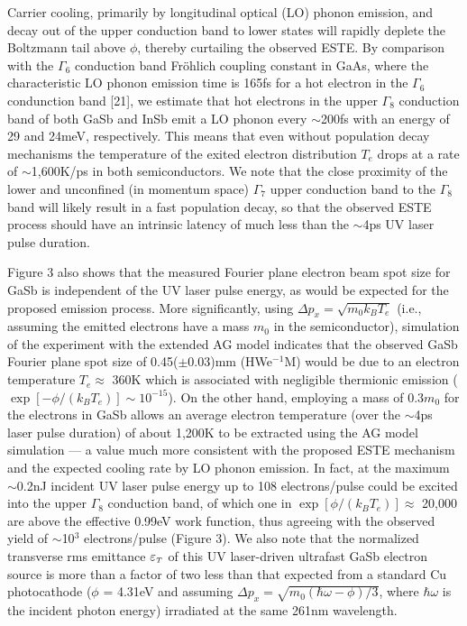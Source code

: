 Carrier cooling, primarily by longitudinal optical (LO) phonon emission, and decay out of the upper conduction band to lower states will rapidly deplete the Boltzmann tail above $\phi$, thereby curtailing the observed ESTE.
By comparison with the $\Gamma_6$ conduction band Fr\"ohlich coupling constant in GaAs, where the characteristic LO phonon emission time is 165fs for a hot electron in the $\Gamma_6$ condunction band [21], we estimate that hot electrons in the upper $\Gamma_8$ conduction band of both GaSb and InSb emit a LO phonon every $\sim$200fs with an energy of 29 and 24meV, respectively.
This means that even without population decay mechanisms the temperature of the exited electron distribution $T_e$ drops at a rate of $\sim$1,600K/ps in both semiconductors.
We note that the close proximity of the lower and unconfined (in momentum space) $\Gamma_7$ upper conduction band to the $\Gamma_8$ band will likely result in a fast population decay, so that the observed ESTE process should have an intrinsic latency of much less than the $\sim$4ps UV laser pulse duration.

Figure 3 also shows that the measured Fourier plane electron beam spot size for GaSb is independent of the UV laser pulse energy, as would be expected for the proposed emission process.
More significantly, using $\Delta p_x = \sqrt{m_0 k_B T_e}$ (i.e., assuming the emitted electrons have a mass $m_0$ in the semiconductor), simulation of the experiment with the extended AG model\cite{berger_semi-analytic_2010} indicates that the observed GaSb Fourier plane spot size of 0.45($\pm$0.03)mm (HWe$^{-1}$M) would be due to an electron temperature $T_e \approx$ 360K which is associated with negligible thermionic emission ($\exp[-\phi/(k_B T_e)] \sim 10^{-15}$).
On the other hand, employing a mass of 0.3$m_0$ for the electrons in GaSb allows an average electron temperature (over the $\sim$4ps laser pulse duration) of about 1,200K to be extracted using the AG model simulation --- a value much more consistent with the proposed ESTE mechanism and the expected cooling rate by LO phonon emission.
In fact, at the maximum $\sim$0.2nJ incident UV laser pulse energy up to 108 electrons/pulse could be excited into the upper $\Gamma_8$ conduction band, of which one in $\exp[\phi/(k_B T_e)] \approx$ 20,000 are above the effective 0.99eV work function, thus agreeing with the observed yield of $\sim$10$^3$ electrons/pulse (Figure 3).
We also note that the normalized transverse rms emittance $\varepsilon_{{\scriptscriptstyle T}}$ of this UV laser-driven ultrafast GaSb electron source is more than a factor of two less than that expected from a standard Cu photocathode ($\phi$ = 4.31eV and assuming $\Delta p_x = \sqrt{m_0 ( \hbar \omega - \phi ) / 3 }$, where $\hbar \omega$ is the incident photon energy\cite{dowell_quantum_2009,jensen_emittance_2010}) irradiated at the same 261nm wavelength.

